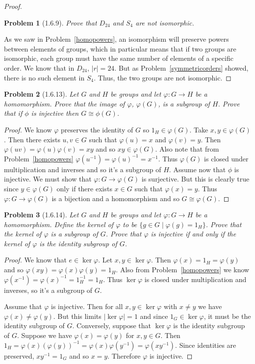 \documentclass{article}
\newtheorem{problem}{Problem}
\begin{document}
\begin{proof}
\begin{problem}[1.6.9]
Prove that $D_{24}$ and $S_4$ are not isomorphic.
\end{problem}
As we saw in Problem~\ref{homopowers}, an isomorphism will preserve powers between elements of groups, which in particular means that if two groups are isomorphic, each group must have the same number of elements of a specific order. We know that in $D_{24}$, $|r| = 24$. But as Problem~\ref{symmetricorders} showed, there is no such element in $S_4$. Thus, the two groups are not isomorphic.
\end{proof}

\begin{problem}[1.6.13]
Let $G$ and $H$ be groups and let $\varphi : G \to H$ be a homomorphism. Prove that the image of $\varphi$, $\varphi(G)$, is a subgroup of $H$. Prove that if $\phi$ is injective then $G \cong \phi(G)$.
\end{problem}
\begin{proof}
We know $\varphi$ preserves the identity of $G$ so $1_H \in \varphi(G)$. Take $x,y \in \varphi(G)$. Then there exists $u,v \in G$ such that $\varphi(u) = x$ and $\varphi(v) = y$. Then $\varphi(uv) = \varphi(u)\varphi(v) = xy$ and so $xy \in \varphi(G)$. Also note that from Problem~\ref{homopowers} $\varphi(u^{-1}) = \varphi(u)^{-1} = x^{-1}$. Thus $\varphi(G)$ is closed under multiplication and inverses and so it's a subgroup of $H$. Assume now that $\phi$ is injective. We must show that $\varphi : G \to \varphi(G)$ is surjective. But this is clearly true since $y \in \varphi(G)$ only if there exists $x \in G$ such that $\varphi(x) = y$. Thus $\varphi : G \to \varphi(G)$ is a bijection and a homomorphism and so $G \cong \varphi(G)$.
\end{proof}

\begin{problem}[1.6.14]
Let $G$ and $H$ be groups and let $\varphi : G \to H$ be a homomorphism. Define the \emph{kernel} of $\varphi$ to be $\{g \in G \mid \varphi(g) = 1_H\}$. Prove that the kernel of $\varphi$ is a subgroup of $G$. Prove that $\varphi$ is injective if and only if the kernel of $\varphi$ is the identity subgroup of $G$.
\end{problem}
\begin{proof}
We know that $e \in \ker \varphi$. Let $x, y \in \ker \varphi$. Then $\varphi(x) = 1_H = \varphi(y)$ and so $\varphi(xy) = \varphi(x)\varphi(y) = 1_H$. Also from Problem~\ref{homopowers} we know $\varphi(x^{-1}) = \varphi(x)^{-1} = 1_H^{-1} = 1_H$. Thus $\ker \varphi$ is closed under multiplication and inverses, so it's a subgroup of $G$.

Assume that $\varphi$ is injective. Then for all $x,y \in \ker \varphi$ with $x \neq y$ we have $\varphi(x) \neq \varphi(y)$. But this limits $|\ker \varphi| = 1$ and since $1_G \in \ker \varphi$, it must be the identity subgroup of $G$. Conversely, suppose that $\ker \varphi$ is the identity subgroup of $G$. Suppose we have $\varphi(x) = \varphi(y)$ for $x,y \in G$. Then $1_H = \varphi(x)(\varphi(y))^{-1} = \varphi(x)\varphi(y^{-1}) = \varphi(xy^{-1})$. Since identities are preserved, $xy^{-1} = 1_G$ and so $x = y$. Therefore $\varphi$ is injective.
\end{proof}
\end{document}
